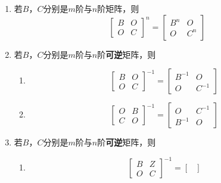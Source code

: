 \documentclass[a4paper,12pt]{article}
\begin{document}
    \begin{enumerate}
        \item 若$B$，$C$分别是$m$阶与$n$阶矩阵，则
        \[
            \begin{bmatrix}
                B & O \\
                O & C
            \end{bmatrix}^n
            = \begin{bmatrix}
                  B^n & O   \\
                  O   & C^n
            \end{bmatrix}
        \]
        \item 若$B$，$C$分别是$m$阶与$n$阶\textbf{可逆}矩阵，则
        \begin{enumerate}
            \item
            \[
                \begin{bmatrix}
                    B & O \\
                    O & C
                \end{bmatrix}^{-1}
                = \begin{bmatrix}
                      B^{-1} & O      \\
                      O      & C^{-1}
                \end{bmatrix}
            \]
            \item
            \[
                \begin{bmatrix}
                    O & B \\
                    C & O
                \end{bmatrix}^{-1}
                = \begin{bmatrix}
                      O      & C^{-1} \\
                      B^{-1} & O
                \end{bmatrix}
            \]
        \end{enumerate}
        \item 若$B$，$C$分别是$m$阶与$n$阶\textbf{可逆}矩阵，则
        \begin{enumerate}
            \item
            \[
                \begin{bmatrix}
                    B & Z \\
                    O & C
                \end{bmatrix}^{-1}
                = \begin{bmatrix}

\end{bmatrix}\]
\end{enumerate}
\end{enumerate}
\end{document}
